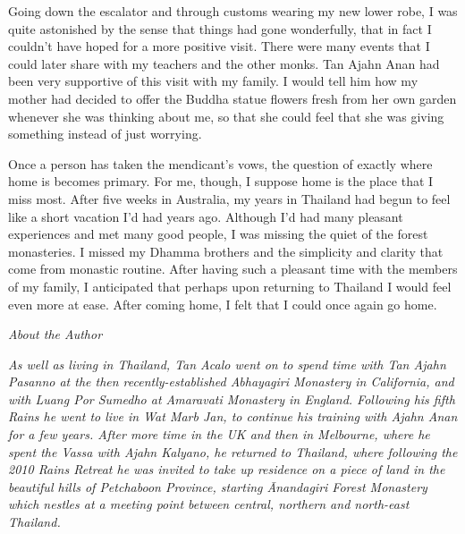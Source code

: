 Going down the escalator and through customs wearing my new lower robe,
I was quite astonished by the sense that things had gone wonderfully,
that in fact I couldn't have hoped for a more positive visit. There were
many events that I could later share with my teachers and the other
monks. Tan Ajahn Anan had been very supportive of this visit with my
family. I would tell him how my mother had decided to offer the Buddha
statue flowers fresh from her own garden whenever she was thinking about
me, so that she could feel that she was giving something instead of just
worrying.

Once a person has taken the mendicant's vows, the question of exactly
where home is becomes primary. For me, though, I suppose home is the
place that I miss most. After five weeks in Australia, my years in
Thailand had begun to feel like a short vacation I'd had years ago.
Although I'd had many pleasant experiences and met many good people, I
was missing the quiet of the forest monasteries. I missed my Dhamma
brothers and the simplicity and clarity that come from monastic routine.
After having such a pleasant time with the members of my family, I
anticipated that perhaps upon returning to Thailand I would feel even
more at ease. After coming home, I felt that I could once again go home.

\emph{About the Author}

\emph{As well as living in Thailand, Tan Acalo went on to spend time
with Tan Ajahn Pasanno at the then recently-established Abhayagiri
Monastery in California, and with Luang Por Sumedho at Amaravati
Monastery in England. Following his fifth Rains he went to live in Wat
Marb Jan, to continue his training with Ajahn Anan for a few years.
After more time in the UK and then in Melbourne, where he spent the
Vassa with Ajahn Kalyano, he returned to Thailand, where following the
2010 Rains Retreat he was invited to take up residence on a piece of
land in the beautiful hills of Petchaboon Province, starting Ānandagiri
Forest Monastery which nestles at a meeting point between central,
northern and north-east Thailand.}

